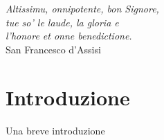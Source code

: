 \thispagestyle{empty}
\vspace*{15ex}
\begin{flushright}
\textit{Altissimu, onnipotente, bon Signore,\\
tue so’ le laude, la gloria e \\
l’honore et onne benedictione.\\}
\vspace{4ex}
\scriptsize{San Francesco d'Assisi}
\end{flushright}
\cleardoublepage

\chapter*{Introduzione}
\label{chap:abstract}
Una breve introduzione